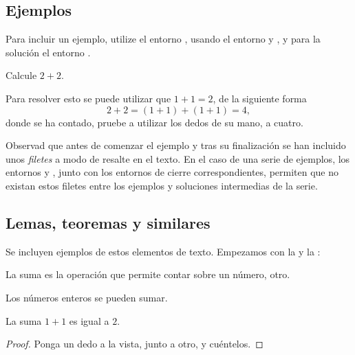 \subsection{Ejemplos}%

Para incluir un ejemplo, utilize el entorno , usando el entorno  y , y para la solución el entorno  . 

\begin{ejmp}
Calcule $2+2$.
\end{ejmp}
\begin{sol}
%
Para resolver esto se puede utilizar que $1+1=2$, de la siguiente forma
\begin{equation*}%
2+2=(1+1)+(1+1)=4,
\end{equation*}
donde se ha contado, pruebe a utilizar los dedos de su mano, a cuatro.
\end{sol}

Observad que antes de comenzar el ejemplo y tras su finalización se han incluido unos \emph{filetes} a modo de resalte en el texto. En el caso de una serie de ejemplos, los entornos  y  , junto con los entornos de cierre correspondientes, permiten que no existan estos filetes entre los ejemplos y soluciones intermedias de la serie.
 
\subsection{Lemas, teoremas y similares}

Se incluyen ejemplos de estos elementos de texto. Empezamos con la  y la :

\begin{defn}[Suma]
 La suma es la operación que permite contar sobre un número, otro.
\end{defn}


\begin{prop}[Suma]
 Los números enteros se pueden sumar.
\end{prop}


\begin{lema}[Suma de 1 y 1]
 La suma $1+1$ es igual a $2$.
\end{lema}
\begin{proof}
Ponga un dedo a la vista, junto a otro, y cuéntelos.
\end{proof}



